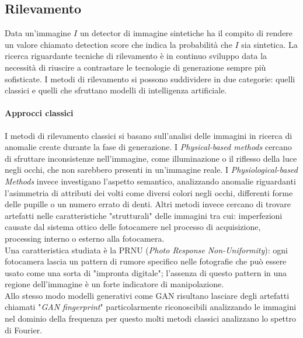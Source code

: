 \subsection{Rilevamento}
Data un'immagine $I$ un detector di immagine sintetiche ha il compito di rendere un valore chiamato detection score che indica la probabilità che $I$ sia sintetica.
La ricerca riguardante tecniche di rilevamento è in continuo sviluppo data la necessità di riuscire a contrastare le tecnologie di generazione sempre più sofisticate.
I metodi di rilevamento si possono suddividere in due categorie: quelli classici e quelli che sfruttano modelli di intelligenza artificiale.
\paragraph{Approcci classici}
I metodi di rilevamento classici si basano sull'analisi delle immagini in ricerca di anomalie create durante la fase di generazione.
I \textit{Physical-based methods} cercano di sfruttare inconsistenze nell'immagine, come illuminazione o il riflesso della luce negli occhi, che non sarebbero presenti in un'immagine reale. I \textit{Physiological-based Methods} invece investigano l'aspetto semantico, analizzando anomalie riguardanti l'asimmetria di attributi dei volti come diversi colori negli occhi, differenti forme delle pupille o un numero errato di denti.
Altri metodi invece cercano di trovare artefatti nelle caratteristiche "strutturali" delle immagini tra cui: imperfezioni causate dal sistema ottico delle fotocamere nel processo di acquisizione, processing interno o esterno alla fotocamera.\\
 Una caratteristica studiata è la PRNU (\textit{Photo Response Non-Uniformity}): ogni fotocamera lascia un pattern di rumore specifico nelle fotografie che può essere usato come una sorta di "impronta digitale"; l'assenza di questo pattern in una regione dell'immagine è un forte indicatore di manipolazione.\\
Allo stesso modo modelli generativi come GAN risultano lasciare degli artefatti chiamati "\textit{GAN fingerprint}" particolarmente riconoscibili analizzando le immagini nel dominio della frequenza per questo molti metodi classici analizzano lo spettro di Fourier.
